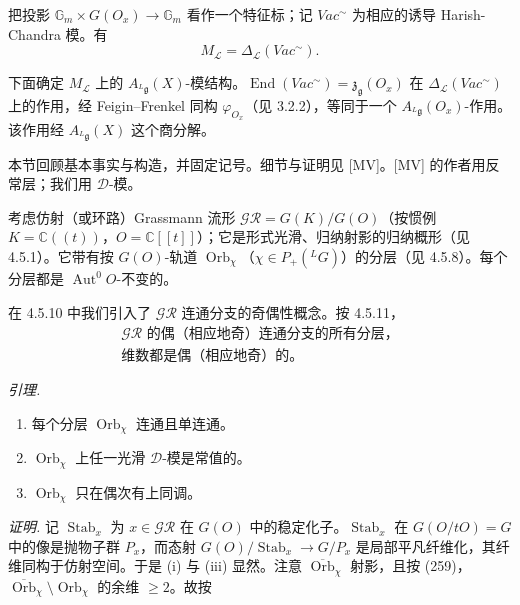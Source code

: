 
把投影 $\mathbb{G}_m\times G(O_x)\to\mathbb{G}_m$ 看作一个特征标；记 $Vac^\sim$ 为相应的诱导 Harish-Chandra 模。有
\begin{equation}\tag{258}
M_{\mathcal{L}}=\Delta_{\mathcal{L}}(Vac^\sim).
\end{equation}

下面确定 $M_{\mathcal{L}}$ 上的 $A_{{}^{L}\mathfrak{g}}(X)$-模结构。$\operatorname{End}(Vac^\sim)=\mathfrak{z}_{\mathfrak{g}}(O_x)$ 在 $\Delta_{\mathcal{L}}(Vac^\sim)$ 上的作用，经 Feigin--Frenkel 同构 $\varphi_{O_x}$（见 3.2.2），等同于一个 $A_{{}^{L}\mathfrak{g}}(O_x)$-作用。该作用经 $A_{{}^{L}\mathfrak{g}}(X)$ 这个商分解。


本节回顾基本事实与构造，并固定记号。细节与证明见 [MV]。[MV] 的作者用反常层；我们用 $\mathcal{D}$-模。

 考虑仿射（或环路）Grassmann 流形 $\mathcal{GR}=G(K)/G(O)$（按惯例 $K=\mathbb{C}((t))$，$O=\mathbb{C}[[t]]$）；它是形式光滑、归纳射影的归纳概形（见 4.5.1）。它带有按 $G(O)$-轨道 $\operatorname{Orb}_\chi$（$\chi\in P_+({}^{L}G)$）的分层（见 4.5.8）。每个分层都是 $\operatorname{Aut}^0O$-不变的。

在 4.5.10 中我们引入了 $\mathcal{GR}$ 连通分支的奇偶性概念。按 4.5.11，
\begin{equation}\tag{259}
\begin{array}{c}
\text{$\mathcal{GR}$ 的偶（相应地奇）连通分支的所有分层，}\\[2pt]
\text{维数都是偶（相应地奇）的。}
\end{array}
\end{equation}

 \emph{引理.}
\begin{enumerate}[label=(\roman*),leftmargin=2.2em]
\item 每个分层 $\operatorname{Orb}_\chi$ 连通且单连通。
\item $\operatorname{Orb}_\chi$ 上任一光滑 $\mathcal{D}$-模是常值的。
\item $\operatorname{Orb}_\chi$ 只在偶次有上同调。
\end{enumerate}

\emph{证明.} 记 $\operatorname{Stab}_x$ 为 $x\in\mathcal{GR}$ 在 $G(O)$ 中的稳定化子。$\operatorname{Stab}_x$ 在 $G(O/tO)=G$ 中的像是抛物子群 $P_x$，而态射 $G(O)/\operatorname{Stab}_x\to G/P_x$ 是局部平凡纤维化，其纤维同构于仿射空间。于是 (i) 与 (iii) 显然。注意 $\overline{\operatorname{Orb}}_\chi$ 射影，且按 (259)，$\overline{\operatorname{Orb}}_\chi\setminus\operatorname{Orb}_\chi$ 的余维 $\ge 2$。故按

